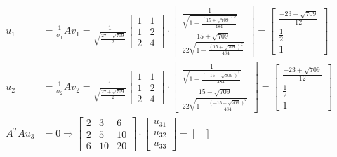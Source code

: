 \documentclass[a4paper, spanish]{article}
\begin{document}
    \begin{align}
      u_1 &=
      \frac{1}{\sigma_1}Av_1 =
      \frac{1}{\sqrt{\frac{27 - \sqrt{709}}{2}}}
      \begin{bmatrix}
        1 & 1\\
        1 & 2\\
        2 & 4
      \end{bmatrix}
      \cdot
      \begin{bmatrix}
        \frac{1}{\sqrt{1 + \frac{(15 + \sqrt{709})^2}{484}}} \\
        \frac{15 + \sqrt{709}}{22\sqrt{1 + \frac{(15 + \sqrt{709})^2}{484}}}
      \end{bmatrix}
      =
      \begin{bmatrix}
        \frac{-23-\sqrt{709}}{12} \\
        \frac{1}{2} \\
        1
      \end{bmatrix} \\
      u_2 &=
      \frac{1}{\sigma_2}Av_2 =
      \frac{1}{\sqrt{\frac{27 + \sqrt{709}}{2}}}
      \begin{bmatrix}
        1 & 1\\
        1 & 2\\
        2 & 4
      \end{bmatrix}
      \cdot
      \begin{bmatrix}
        \frac{1}{\sqrt{1 + \frac{(- 15 + \sqrt{709})^2}{484}}} \\
        \frac{15 - \sqrt{709}}{22\sqrt{1 + \frac{(- 15 + \sqrt{709})^2}{484}}}
      \end{bmatrix}
      =
      \begin{bmatrix}
        \frac{-23+\sqrt{709}}{12} \\
        \frac{1}{2} \\
        1
      \end{bmatrix}\\
      A^T A u_3 &= 0
      \Rightarrow
      \begin{bmatrix}
        2 & 3 & 6 \\
        2 & 5 & 10 \\
        6 & 10 & 20
      \end{bmatrix}
      \cdot
      \begin{bmatrix}
        u_{31} \\
        u_{32} \\
        u_{33}
      \end{bmatrix}
      =
      \begin{bmatrix}

\end{bmatrix}
\end{align}
\end{document}
